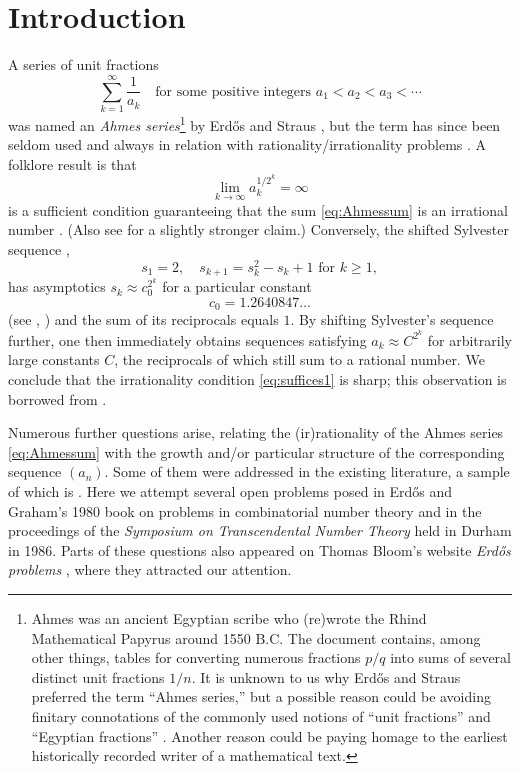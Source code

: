 \documentclass[11pt,letterpaper,reqno]{amsart}
\numberwithin{equation}{section}
\theoremstyle{definition}
\numberwithin{equation}{section}
\begin{document}
\section{Introduction}
A series of unit fractions
\begin{equation}\label{eq:Ahmessum}
\sum_{k=1}^{\infty} \frac{1}{a_k} \quad\text{for some positive integers } a_1<a_2<a_3<\cdots
\end{equation}
was named an \emph{Ahmes series}\footnote{Ahmes was an ancient Egyptian scribe who (re)wrote the Rhind Mathematical Papyrus around 1550 B.C. The document contains, among other things, tables for converting numerous fractions $p/q$ into sums of several distinct unit fractions $1/n$. It is unknown to us why Erd\H{o}s and Straus preferred the term ``Ahmes series,'' but a possible reason could be avoiding finitary connotations of the commonly used notions of ``unit fractions'' and ``Egyptian fractions'' \cite{Gra13,BE22}. Another reason could be paying homage to the earliest historically recorded writer of a mathematical text.} by Erd\H{o}s and Straus \cite{ES64}, but the term has since been seldom used and always in relation with rationality/irrationality problems \cite{TY02,HT04}.
A folklore result is that
\begin{equation}\label{eq:suffices1}
\lim_{k\to\infty}a_k^{1/2^k}=\infty
\end{equation}
is a sufficient condition guaranteeing that the sum \eqref{eq:Ahmessum} is an irrational number \cite{ES64,E75}.
(Also see \cite[Theorem 1]{E75} for a slightly stronger claim.)
Conversely, the shifted Sylvester sequence \cite[A129871]{OEIS},
\begin{equation}\label{eq:Sylvester}
s_1=2, \quad s_{k+1} = s_k^2 - s_k + 1 \text{ for } k\geqslant 1,
\end{equation}
has asymptotics $s_k \approx c_0^{2^k}$ for a particular constant
\begin{equation}\label{eq:constVardi}
c_0=1.2640847\ldots
\end{equation}
(see \cite[p.~109]{GKP89}, \cite{Var91}) and the sum of its reciprocals equals $1$. By shifting Sylvester's sequence further, one then immediately obtains sequences satisfying $a_k \approx C^{2^k}$ for arbitrarily large constants $C$, the reciprocals of which still sum to a rational number. We conclude that the irrationality condition \eqref{eq:suffices1} is sharp; this observation is borrowed from \cite[p.~2]{E75}.

Numerous further questions arise, relating the (ir)rationality of the Ahmes series \eqref{eq:Ahmessum} with the growth and/or particular structure of the corresponding sequence $(a_n)$.
Some of them were addressed in the existing literature, a sample of which is \cite{ES64,San84,Bad87,Duv01,TY02,HT04}.
Here we attempt several open problems posed in Erd\H{o}s and Graham's 1980 book on problems in combinatorial number theory \cite{EG80} and in the proceedings \cite{Erd88} of the \emph{Symposium on Transcendental Number Theory} held in Durham in 1986. Parts of these questions also appeared on Thomas Bloom's website \emph{Erd\H{o}s problems} \cite{EP}, where they attracted our attention.
\end{document}
